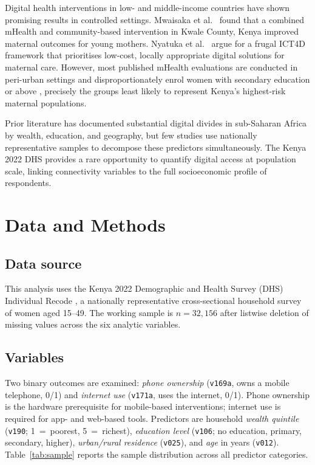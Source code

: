 \documentclass[9pt,twoside]{pnas-new}
\begin{document}
Digital health interventions in low- and middle-income countries have
shown promising results in controlled settings. Mwaisaka et al.\
\cite{mwaisaka2025} found that a combined mHealth and community-based
intervention in Kwale County, Kenya improved maternal outcomes for young
mothers. Nyatuka et al.\ \cite{nyatuka2025} argue for a frugal ICT4D
framework that prioritises low-cost, locally appropriate digital
solutions for maternal care. However, most published mHealth evaluations
are conducted in peri-urban settings and disproportionately enrol women
with secondary education or above
\cite{batist2019,till2023,soyege2025}, precisely the groups least
likely to represent Kenya's highest-risk maternal populations.

Prior literature has documented substantial digital divides in
sub-Saharan Africa by wealth, education, and geography, but few studies
use nationally representative samples to decompose these predictors
simultaneously. The Kenya 2022 DHS provides a rare opportunity to
quantify digital access at population scale, linking connectivity
variables to the full socioeconomic profile of respondents.

\section*{Data and Methods}

\subsection*{Data source}

This analysis uses the Kenya 2022 Demographic and Health Survey (DHS)
Individual Recode \cite{kdhs2022}, a nationally representative
cross-sectional household survey of women aged 15--49. The working sample
is $n = 32{,}156$ after listwise deletion of missing values across the
six analytic variables.

\subsection*{Variables}

Two binary outcomes are examined: \textit{phone ownership}
(\texttt{v169a}, owns a mobile telephone, 0/1) and \textit{internet use}
(\texttt{v171a}, uses the internet, 0/1). Phone ownership is the
hardware prerequisite for mobile-based interventions; internet use is
required for app- and web-based tools. Predictors are household
\textit{wealth quintile} (\texttt{v190}; 1~=~poorest, 5~=~richest),
\textit{education level} (\texttt{v106}; no education, primary,
secondary, higher), \textit{urban/rural residence} (\texttt{v025}), and
\textit{age} in years (\texttt{v012}). Table~\ref{tab:sample} reports
the sample distribution across all predictor categories.
\end{document}
